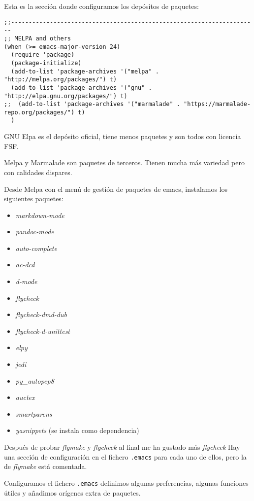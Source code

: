 \documentclass[
  12pt,
  spanish,
]{article}
\providecommand{\tightlist}{%
  \setlength{\itemsep}{0pt}\setlength{\parskip}{0pt}}
\begin{document}
Esta es la sección donde configuramos los depósitos de paquetes:

\begin{verbatim}
;;----------------------------------------------------------------------
;; MELPA and others
(when (>= emacs-major-version 24)
  (require 'package)
  (package-initialize)
  (add-to-list 'package-archives '("melpa" . "http://melpa.org/packages/") t)
  (add-to-list 'package-archives '("gnu" . "http://elpa.gnu.org/packages/") t)
;;  (add-to-list 'package-archives '("marmalade" . "https://marmalade-repo.org/packages/") t)
  )
\end{verbatim}

GNU Elpa es el depósito oficial, tiene menos paquetes y son todos con
licencia FSF.

Melpa y Marmalade son paquetes de terceros. Tienen mucha más variedad
pero con calidades dispares.

Desde Melpa con el menú de gestión de paquetes de emacs, instalamos los
siguientes paquetes:

\begin{itemize}
\tightlist
\item
  \emph{markdown-mode}
\item
  \emph{pandoc-mode}
\item
  \emph{auto-complete}
\item
  \emph{ac-dcd}
\item
  \emph{d-mode}
\item
  \emph{flycheck}
\item
  \emph{flycheck-dmd-dub}
\item
  \emph{flycheck-d-unittest}
\item
  \emph{elpy}
\item
  \emph{jedi}
\item
  \emph{py\_autopep8}
\item
  \emph{auctex}
\item
  \emph{smartparens}
\item
  \emph{yasnippets} (se instala como dependencia)
\end{itemize}

Después de probar \emph{flymake} y \emph{flycheck} al final me ha
gustado más \emph{flycheck} Hay una sección de configuración en el
fichero \texttt{.emacs} para cada uno de ellos, pero la de
\emph{flymake} está comentada.

Configuramos el fichero \texttt{.emacs} definimos algunas preferencias,
algunas funciones útiles y añadimos orígenes extra de paquetes.
\end{document}
